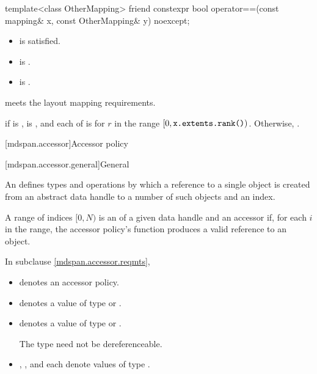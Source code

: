 %
\begin{itemdecl}
template<class OtherMapping>
  friend constexpr bool operator==(const mapping& x, const OtherMapping& y) noexcept;
\end{itemdecl}

\begin{itemdescr}
\pnum
\constraints
\begin{itemize}
\item
{} is satisfied.
\item
{} is .
\item
{} is .
\end{itemize}

\pnum
\expects
{} meets the layout mapping requirements.

\pnum
\returns
{} if  is ,
 is , and
each of  is 
for $r$ in the range  $[0, \texttt{x.extents.rank()})$.
Otherwise, .
\end{itemdescr}

[mdspan.accessor]{Accessor policy}

[mdspan.accessor.general]{General}

\pnum
An  defines types and operations by which
a reference to a single object is created
from an abstract data handle to a number of such objects and an index.

\pnum
A range of indices $[0, N)$ is an  of
a given data handle and an accessor
if, for each $i$ in the range,
the accessor policy's  function produces a valid reference to an object.

\pnum
In subclause \ref{mdspan.accessor.reqmts},

\begin{itemize}
\item
{} denotes an accessor policy.
\item
{} denotes a value of type  or .
\item
{} denotes a value of type  or .
\begin{note}
The type  need not be dereferenceable.
\end{note}
\item
{}, , and  each denote values of type .
\end{itemize}

